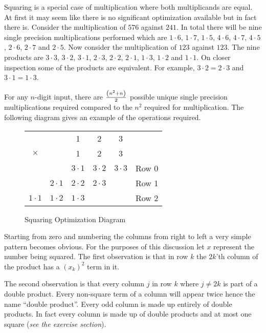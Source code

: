 \documentclass[b5paper]{book}
\begin{document}
Squaring is a special case of multiplication where both multiplicands are equal.  At first it may seem like there is no significant optimization
available but in fact there is.  Consider the multiplication of $576$ against $241$.  In total there will be nine single precision multiplications
performed which are $1\cdot 6$, $1 \cdot 7$, $1 \cdot 5$, $4 \cdot 6$, $4 \cdot 7$, $4 \cdot 5$, $2 \cdot  6$, $2 \cdot 7$ and $2 \cdot 5$.  Now consider 
the multiplication of $123$ against $123$.  The nine products are $3 \cdot 3$, $3 \cdot 2$, $3 \cdot 1$, $2 \cdot 3$, $2 \cdot 2$, $2 \cdot 1$, 
$1 \cdot 3$, $1 \cdot 2$ and $1 \cdot 1$.  On closer inspection some of the products are equivalent.  For example, $3 \cdot 2 = 2 \cdot 3$ 
and $3 \cdot 1 = 1 \cdot 3$. 

For any $n$-digit input, there are ${{\left (n^2 + n \right)}\over 2}$ possible unique single precision multiplications required compared to the $n^2$
required for multiplication.  The following diagram gives an example of the operations required.

\begin{figure}[here]
\begin{center}
\begin{tabular}{ccccc|c}
&&1&2&3&\\
$\times$ &&1&2&3&\\
\hline && $3 \cdot 1$ & $3 \cdot 2$ & $3 \cdot 3$ & Row 0\\
       & $2 \cdot 1$  & $2 \cdot 2$ & $2 \cdot 3$ && Row 1 \\
         $1 \cdot 1$  & $1 \cdot 2$ & $1 \cdot 3$ &&& Row 2 \\
\end{tabular}
\end{center}
\caption{Squaring Optimization Diagram}
\end{figure}

Starting from zero and numbering the columns from right to left a very simple pattern becomes obvious.  For the purposes of this discussion let $x$
represent the number being squared.  The first observation is that in row $k$ the $2k$'th column of the product has a $\left (x_k \right)^2$ term in it.  

The second observation is that every column $j$ in row $k$ where $j \ne 2k$ is part of a double product.  Every non-square term of a column will
appear twice hence the name ``double product''.  Every odd column is made up entirely of double products.  In fact every column is made up of double 
products and at most one square (\textit{see the exercise section}).  
\end{document}
